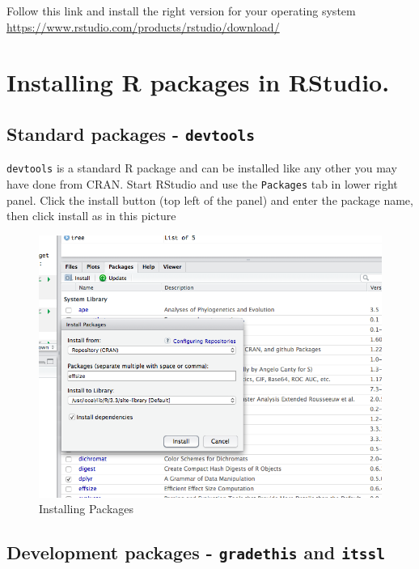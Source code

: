 \documentclass[
]{book}
\begin{document}
Follow this link and install the right version for your operating system \url{https://www.rstudio.com/products/rstudio/download/}

\hypertarget{installing-r-packages-in-rstudio.}{%
\section{Installing R packages in RStudio.}\label{installing-r-packages-in-rstudio.}}

\hypertarget{standard-packages---devtools}{%
\subsection{\texorpdfstring{Standard packages - \texttt{devtools}}{Standard packages - devtools}}\label{standard-packages---devtools}}

\texttt{devtools} is a standard R package and can be installed like any other you may have done from CRAN. Start RStudio and use the \texttt{Packages} tab in lower right panel. Click the install button (top left of the panel) and enter the package name, then click install as in this picture

\begin{figure}
\centering
\includegraphics{fig/package_install.png}
\caption{Installing Packages}
\end{figure}

\hypertarget{development-packages---gradethis-and-itssl}{%
\subsection{\texorpdfstring{Development packages - \texttt{gradethis} and \texttt{itssl}}{Development packages - gradethis and itssl}}\label{development-packages---gradethis-and-itssl}}
\end{document}

